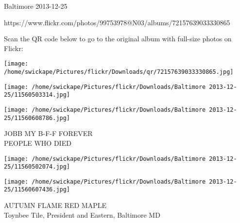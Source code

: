 \documentclass[10pt,letterpaper]{article}
\begin{document}
Baltimore 2013-12-25

https://www.flickr.com/photos/99753978@N03/albums/72157639033330865

Scan the QR code below to go to the original album with full-size photos on Flickr:

\texttt{[image: /home/swickape/Pictures/flickr/Downloads/qr/72157639033330865.jpg]}
\pagebreak

\texttt{[image: /home/swickape/Pictures/flickr/Downloads/Baltimore 2013-12-25/11560503314.jpg]}

\vspace{0.25in}
\texttt{[image: /home/swickape/Pictures/flickr/Downloads/Baltimore 2013-12-25/11560608786.jpg]}

JOBB MY B{-}F{-}F FOREVER\\
PEOPLE WHO DIED\\
\pagebreak

\texttt{[image: /home/swickape/Pictures/flickr/Downloads/Baltimore 2013-12-25/11560502074.jpg]}

\vspace{0.25in}
\texttt{[image: /home/swickape/Pictures/flickr/Downloads/Baltimore 2013-12-25/11560607436.jpg]}

AUTUMN FLAME RED MAPLE\\
Toynbee Tile, President and Eastern, Baltimore MD\\
\pagebreak
\end{document}
